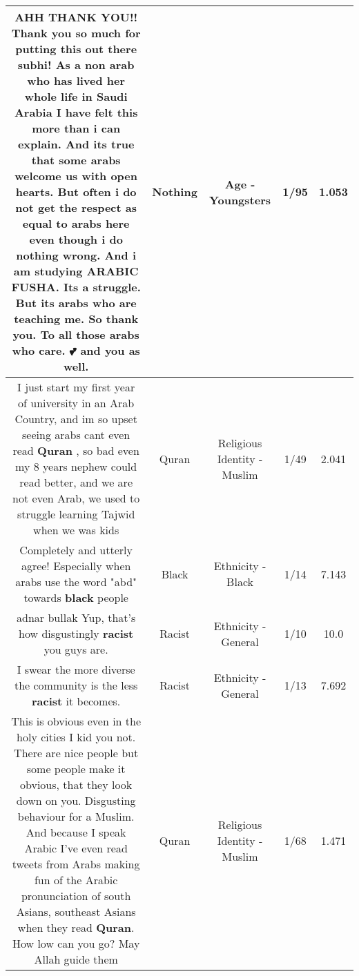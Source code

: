 \documentclass[11pt]{article}
\newlength\mylength
\begin{document}
\begin{center}
\begin{longtable}{|C{.65\mylength}|C{.30\mylength}|C{.12\mylength}|C{.12\mylength}|C{.12\mylength}|}
  \small AHH THANK YOU!!  Thank you so much for putting this out there subhi! As a non arab who has lived her whole life in Saudi Arabia I have felt this more than i can explain. And its true that some arabs welcome us with open hearts. But often i do not get the respect as equal to arabs here even though i do \textbf{nothing} wrong. And i am studying ARABIC FUSHA. Its a struggle. But its arabs who are teaching me. So thank you. To all those arabs who care. 💕 and you as well.\normalsize   & Nothing & Age - Youngsters & 1/95 & 1.053 \\  \hline
  \small I just start my first year of university in an Arab Country, and im so upset seeing arabs cant even read \textbf{Quran} , so bad even my 8 years nephew could read better, and we are not even Arab, we used to struggle learning Tajwid when we was kids\normalsize   & Quran & Religious Identity - Muslim & 1/49 & 2.041 \\  \hline
  \small Completely and utterly agree! Especially when arabs use the word "abd" towards \textbf{black} people\normalsize   & Black & Ethnicity - Black & 1/14 & 7.143 \\  \hline
  \small adnar bullak Yup, that's how disgustingly \textbf{racist} you guys are.\normalsize   & Racist & Ethnicity - General & 1/10 & 10.0 \\  \hline
  \small I swear the more diverse the community is the less \textbf{racist} it becomes.\normalsize   & Racist & Ethnicity - General & 1/13 & 7.692 \\  \hline
  \small This is obvious even in the holy cities I kid you not. There are nice people but some people make it obvious, that they look down on you. Disgusting behaviour for a Muslim. And because I speak Arabic I've even read tweets from Arabs making fun of the Arabic pronunciation of south Asians, southeast Asians when they read \textbf{Quran}. How low can you go? May Allah guide them\normalsize   & Quran & Religious Identity - Muslim & 1/68 & 1.471 \\  \hline

\end{longtable}
\end{center}
\end{document}
